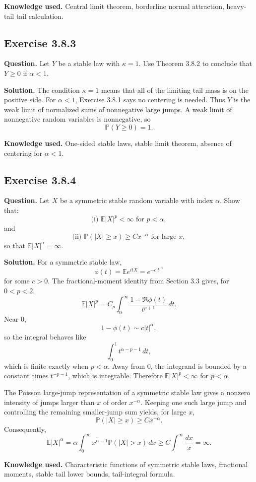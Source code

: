\documentclass[11pt]{article}
\newcommand{\Prob}{\mathbb{P}}
\newcommand{\E}{\mathbb{E}}
\begin{document}
\textbf{Knowledge used.}
Central limit theorem, borderline normal attraction, heavy-tail tail
calculation.

\subsection*{Exercise 3.8.3}
\textbf{Question.}
Let $Y$ be a stable law with $\kappa=1$.  Use Theorem 3.8.2 to conclude
that $Y\ge0$ if $\alpha<1$.

\textbf{Solution.}
The condition $\kappa=1$ means that all of the limiting tail mass is on
the positive side.  For $\alpha<1$, Exercise 3.8.1 says no centering is
needed.  Thus $Y$ is the weak limit of normalized sums of nonnegative
large jumps.  A weak limit of nonnegative random variables is
nonnegative, so
\[
  \Prob(Y\ge0)=1.
\]

\textbf{Knowledge used.}
One-sided stable laws, stable limit theorem, absence of centering for
$\alpha<1$.

\subsection*{Exercise 3.8.4}
\textbf{Question.}
Let $X$ be a symmetric stable random variable with index $\alpha$.
Show that:
\[
  \text{(i) } \E|X|^p<\infty \text{ for }p<\alpha,
\]
and
\[
  \text{(ii) } \Prob(|X|\ge x)\ge Cx^{-\alpha}
  \text{ for large }x,
\]
so that $\E|X|^\alpha=\infty$.

\textbf{Solution.}
For a symmetric stable law,
\[
  \phi(t)=\E e^{itX}=e^{-c|t|^\alpha}
\]
for some $c>0$.  The fractional-moment identity from Section 3.3 gives,
for $0<p<2$,
\[
  \E|X|^p
  =
  C_p\int_0^\infty \frac{1-\Re\phi(t)}{t^{p+1}}\,dt.
\]
Near $0$,
\[
  1-\phi(t)\sim c|t|^\alpha,
\]
so the integral behaves like
\[
  \int_0^1 t^{\alpha-p-1}\,dt,
\]
which is finite exactly when $p<\alpha$.  Away from $0$, the integrand is
bounded by a constant times $t^{-p-1}$, which is integrable.
Therefore $\E|X|^p<\infty$ for $p<\alpha$.

The Poisson large-jump representation of a symmetric stable law gives a
nonzero intensity of jumps larger than $x$ of order $x^{-\alpha}$.
Keeping one such large jump and controlling the remaining smaller-jump
sum yields, for large $x$,
\[
  \Prob(|X|\ge x)\ge Cx^{-\alpha}.
\]
Consequently,
\[
  \E|X|^\alpha
  =
  \alpha\int_0^\infty x^{\alpha-1}\Prob(|X|>x)\,dx
  \ge
  C\int^\infty \frac{dx}{x}
  =
  \infty.
\]

\textbf{Knowledge used.}
Characteristic functions of symmetric stable laws, fractional moments,
stable tail lower bounds, tail-integral formula.
\end{document}

